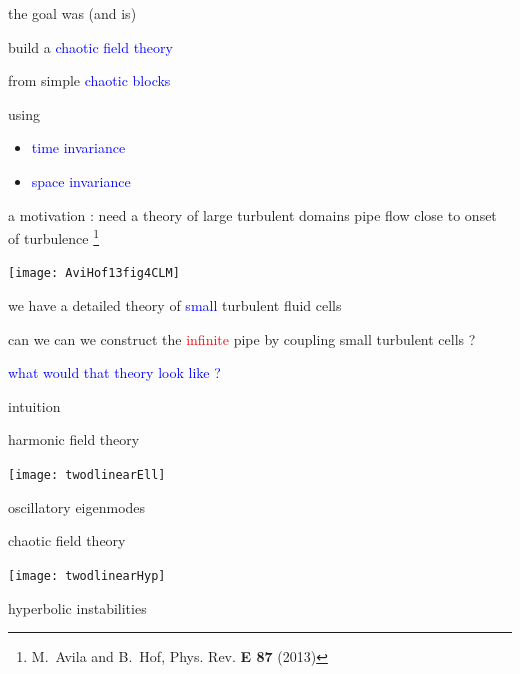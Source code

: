 \begin{frame}{the goal was (and is)}
\vfill

\begin{center}
{\Large build
a \textcolor{blue}{chaotic field theory}
\medskip

from simple  \textcolor{blue}{chaotic blocks}
}
\end{center}

\vfill
using
\begin{itemize}
  \item
\textcolor{blue}{time invariance}
  \item
\textcolor{blue}{space invariance}
\end{itemize}
\end{frame} %

\begin{frame}{a motivation : need a theory of {\Huge large} turbulent domains}
pipe flow close to onset of turbulence
\footnote{M.~Avila and B.~Hof, {Phys. Rev. \bf E 87} (2013)}
\begin{center}
\texttt{[image: AviHof13fig4CLM]}
\end{center}
we have a detailed theory of {\small \textcolor{blue}{small}} turbulent fluid cells

\bigskip

can we can we construct the \textcolor{red}{infinite} pipe by coupling small turbulent cells ?
\bigskip

\textcolor{blue}{what would that theory look like ?}
\end{frame} %

\begin{frame}{intuition}
\begin{center}
            \begin{minipage}[c]{0.40\textwidth}\begin{center}
{\color{purple}harmonic} field theory
\bigskip

\texttt{[image: twodlinearEll]}\\
\bigskip

{\color{blue}oscillatory eigenmodes}
            \end{center}\end{minipage}
            \hspace{2ex}
            \begin{minipage}[c]{0.46\textwidth}\begin{center}
{\color{purple}chaotic} field theory\\
\bigskip

\texttt{[image: twodlinearHyp]}\\
\bigskip

{\color{blue}hyperbolic instabilities}
            \end{center}\end{minipage}
\end{center}
\end{frame} %

